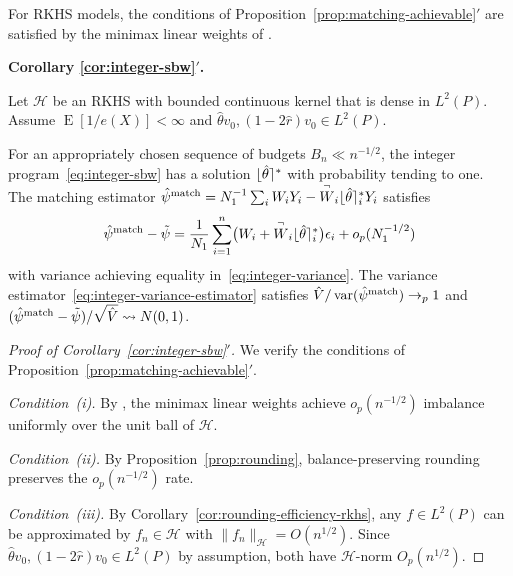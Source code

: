 \documentclass{article}
\newcommand{\paragraph}[1]{\par\noindent\textit{#1}\enspace}
\newenvironment{corollaryprime}[1]{%
  \par\medskip\noindent\textbf{Corollary #1$'$.}\itshape\space
}{%
  \par\medskip
}
\theoremstyle{definition}
\DeclareMathOperator{\E}{E}
\newcommand{\calH}{\ensuremath{\mathcal{H}}}
\DeclareMathOperator{\Var}{var}
\DeclarePairedDelimiter\round{\lfloor}{\rceil}
\newcommand{\<}{\langle}
\renewcommand{\>}{\rangle}
\begin{document}
\begin{refsection}
For RKHS models, the conditions of Proposition~\ref{prop:matching-achievable}$'$ are satisfied by the minimax linear weights of \citet{hirshberg2019minimax}.

\begin{corollaryprime}{\ref{cor:integer-sbw}}
Let $\calH$ be an RKHS with bounded continuous kernel that is dense in $L^2(P)$. Assume $\E[1/e(X)] < \infty$ and $\hat\theta v_0, (1{-}2\hat r)v_0 \in L^2(P)$.

For an appropriately chosen sequence of budgets $B_n \ll n^{-1/2}$, the integer program~\eqref{eq:integer-sbw} has a solution $\round{\hat\theta}^*$ with probability tending to one. The matching estimator $\hat\psi^{\textup{match}} = N_1^{-1}\sum_i W_i Y_i - \overset{\neg}{W}_i \round{\hat\theta}^*_i Y_i$ satisfies
\[
\hat\psi^{\textup{match}} - \tilde\psi = \frac{1}{N_1}\sum_{i=1}^n\bigl(W_i + \overset{\neg}{W}_i\round{\hat\theta}^*_i\bigr)\epsilon_i + o_p(N_1^{-1/2})
\]
with variance achieving equality in~\eqref{eq:integer-variance}. The variance estimator~\eqref{eq:integer-variance-estimator} satisfies $\hat V / \Var(\hat\psi^{\textup{match}}) \to_p 1$ and $(\hat\psi^{\textup{match}} - \tilde\psi)/\sqrt{\hat V} \rightsquigarrow N(0,1)$.
\end{corollaryprime}

\begin{proof}[Proof of Corollary~\ref{cor:integer-sbw}$'$]
We verify the conditions of Proposition~\ref{prop:matching-achievable}$'$.

\paragraph{Condition~(i).}
By \citet[Theorem 2]{hirshberg2019minimax}, the minimax linear weights achieve $o_p(n^{-1/2})$ imbalance uniformly over the unit ball of $\calH$.

\paragraph{Condition~(ii).}
By Proposition~\ref{prop:rounding}, balance-preserving rounding preserves the $o_p(n^{-1/2})$ rate.

\paragraph{Condition~(iii).}
By Corollary~\ref{cor:rounding-efficiency-rkhs}, any $f \in L^2(P)$ can be approximated by $f_n \in \calH$ with $\|f_n\|_\calH = O(n^{1/2})$. Since $\hat\theta v_0, (1{-}2\hat r)v_0 \in L^2(P)$ by assumption, both have $\calH$-norm $O_p(n^{1/2})$.


\end{proof}
\end{refsection}
\end{document}
